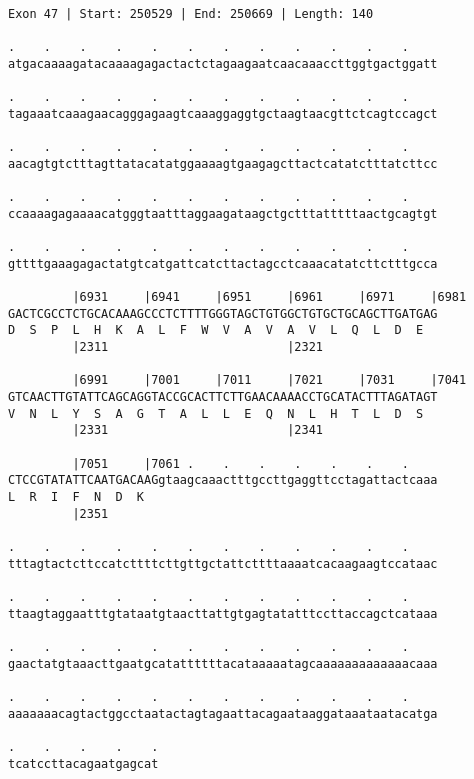 \documentclass{article}
\begin{document}
\begin{Verbatim}
Exon 47 | Start: 250529 | End: 250669 | Length: 140
 
.    .    .    .    .    .    .    .    .    .    .    .    
atgacaaaagatacaaaagagactactctagaagaatcaacaaaccttggtgactggatt
  
.    .    .    .    .    .    .    .    .    .    .    .    
tagaaatcaaagaacagggagaagtcaaaggaggtgctaagtaacgttctcagtccagct
  
.    .    .    .    .    .    .    .    .    .    .    .    
aacagtgtctttagttatacatatggaaaagtgaagagcttactcatatctttatcttcc
  
.    .    .    .    .    .    .    .    .    .    .    .    
ccaaaagagaaaacatgggtaatttaggaagataagctgctttatttttaactgcagtgt
  
.    .    .    .    .    .    .    .    .    .    .    .    
gttttgaaagagactatgtcatgattcatcttactagcctcaaacatatcttctttgcca
  
         |6931     |6941     |6951     |6961     |6971     |6981
GACTCGCCTCTGCACAAAGCCCTCTTTTGGGTAGCTGTGGCTGTGCTGCAGCTTGATGAG
D  S  P  L  H  K  A  L  F  W  V  A  V  A  V  L  Q  L  D  E  
         |2311                         |2321                
  
         |6991     |7001     |7011     |7021     |7031     |7041
GTCAACTTGTATTCAGCAGGTACCGCACTTCTTGAACAAAACCTGCATACTTTAGATAGT
V  N  L  Y  S  A  G  T  A  L  L  E  Q  N  L  H  T  L  D  S  
         |2331                         |2341                
  
         |7051     |7061 .    .    .    .    .    .    .    
CTCCGTATATTCAATGACAAGgtaagcaaactttgccttgaggttcctagattactcaaa
L  R  I  F  N  D  K                                         
         |2351                                              
  
.    .    .    .    .    .    .    .    .    .    .    .    
tttagtactcttccatcttttcttgttgctattcttttaaaatcacaagaagtccataac
  
.    .    .    .    .    .    .    .    .    .    .    .    
ttaagtaggaatttgtataatgtaacttattgtgagtatatttccttaccagctcataaa
  
.    .    .    .    .    .    .    .    .    .    .    .    
gaactatgtaaacttgaatgcatattttttacataaaaatagcaaaaaaaaaaaaacaaa
  
.    .    .    .    .    .    .    .    .    .    .    .    
aaaaaaacagtactggcctaatactagtagaattacagaataaggataaataatacatga
  
.    .    .    .    .
tcatccttacagaatgagcat
\end{Verbatim}
\end{document}
